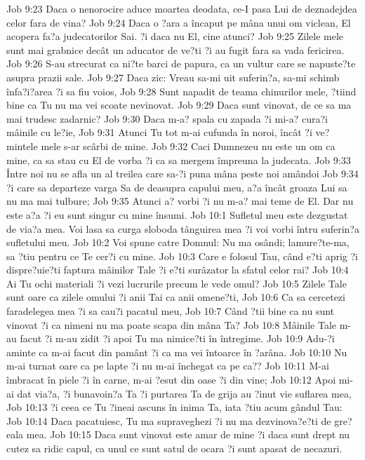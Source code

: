 Job 9:23  Daca o nenorocire aduce moartea deodata, ce-I pasa Lui de deznadejdea celor fara de vina?
Job 9:24  Daca o ?ara a încaput pe mâna unui om viclean, El acopera fa?a judecatorilor Sai. ?i daca nu El, cine atunci?
Job 9:25  Zilele mele sunt mai grabnice decât un aducator de ve?ti ?i au fugit fara sa vada fericirea.
Job 9:26  S-au strecurat ca ni?te barci de papura, ca un vultur care se napuste?te asupra prazii sale.
Job 9:27  Daca zic: Vreau sa-mi uit suferin?a, sa-mi schimb înfa?i?area ?i sa fiu voios,
Job 9:28  Sunt napadit de teama chinurilor mele, ?tiind bine ca Tu nu ma vei scoate nevinovat.
Job 9:29  Daca sunt vinovat, de ce sa ma mai trudesc zadarnic?
Job 9:30  Daca m-a? spala cu zapada ?i mi-a? cura?i mâinile cu le?ie,
Job 9:31  Atunci Tu tot m-ai cufunda în noroi, încât ?i ve?mintele mele s-ar scârbi de mine.
Job 9:32  Caci Dumnezeu nu este un om ca mine, ca sa stau cu El de vorba ?i ca sa mergem împreuna la judecata.
Job 9:33  Între noi nu se afla un al treilea care sa-?i puna mâna peste noi amândoi
Job 9:34  ?i care sa departeze varga Sa de deasupra capului meu, a?a încât groaza Lui sa nu ma mai tulbure;
Job 9:35  Atunci a? vorbi ?i nu m-a? mai teme de El. Dar nu este a?a ?i eu sunt singur cu mine însumi.
Job 10:1  Sufletul meu este dezgustat de via?a mea. Voi lasa sa curga sloboda tânguirea mea ?i voi vorbi întru suferin?a sufletului meu.
Job 10:2  Voi spune catre Domnul: Nu ma osândi; lamure?te-ma, sa ?tiu pentru ce Te cer?i cu mine.
Job 10:3  Care e folosul Tau, când e?ti aprig ?i dispre?uie?ti faptura mâinilor Tale ?i e?ti surâzator la sfatul celor rai?
Job 10:4  Ai Tu ochi materiali ?i vezi lucrurile precum le vede omul?
Job 10:5  Zilele Tale sunt oare ca zilele omului ?i anii Tai ca anii omene?ti,
Job 10:6  Ca sa cercetezi faradelegea mea ?i sa cau?i pacatul meu,
Job 10:7  Când ?tii bine ca nu sunt vinovat ?i ca nimeni nu ma poate scapa din mâna Ta?
Job 10:8  Mâinile Tale m-au facut ?i m-au zidit ?i apoi Tu ma nimice?ti în întregime.
Job 10:9  Adu-?i aminte ca m-ai facut din pamânt ?i ca ma vei întoarce în ?arâna.
Job 10:10  Nu m-ai turnat oare ca pe lapte ?i nu m-ai închegat ca pe ca??
Job 10:11  M-ai îmbracat în piele ?i în carne, m-ai ?esut din oase ?i din vine;
Job 10:12  Apoi mi-ai dat via?a, ?i bunavoin?a Ta ?i purtarea Ta de grija au ?inut vie suflarea mea,
Job 10:13  ?i ceea ce Tu ?ineai ascuns în inima Ta, iata ?tiu acum gândul Tau:
Job 10:14  Daca pacatuiesc, Tu ma supraveghezi ?i nu ma dezvinova?e?ti de gre?eala mea.
Job 10:15  Daca sunt vinovat este amar de mine ?i daca sunt drept nu cutez sa ridic capul, ca unul ce sunt satul de ocara ?i sunt apasat de necazuri.
